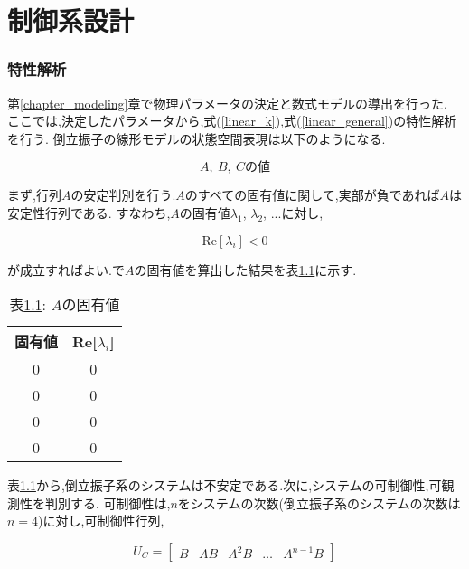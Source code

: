 \chapter{制御系設計}
\subsection{特性解析}
第\ref{chapter_modeling}章で物理パラメータの決定と数式モデルの導出を行った.
ここでは,決定したパラメータから,式(\ref{linear_k}),式(\ref{linear_general})の特性解析を行う.
倒立振子の線形モデルの状態空間表現は以下のようになる.

\begin{equation}
    A,\ B,\ Cの値
    \label{ABC}
\end{equation}

まず,行列$A$の安定判別を行う.$A$のすべての固有値に関して,実部が負であれば$A$は安定性行列である.
すなわち,$A$の固有値$\lambda_{1}$, $\lambda_{2}$, $...$に対し,

$$
    \mbox{Re}[\lambda_{i}] < 0
$$

が成立すればよい.\MaTX{}で$A$の固有値を算出した結果を表\ref{eigen_A}に示す.

\begin{table}[htbp]
    \begin{center}
        \caption{表\ref{eigen_A}: $A$の固有値}
        \begin{tabular}{|c|c|} \hline
            固有値 & Re[$\lambda_{i}$] \\ \hline \hline
            0 & 0 \\ \hline
            0 & 0 \\ \hline
            0 & 0 \\ \hline
            0 & 0 \\ \hline
        \end{tabular}
        \label{eigen_A}
    \end{center}
\end{table}

表\ref{eigen_A}から,倒立振子系のシステムは不安定である.次に,システムの可制御性,可観測性を判別する.
可制御性は,$n$をシステムの次数(倒立振子系のシステムの次数は$n = 4$)に対し,可制御性行列,

$$
    U_{C} =
    \left[
        \begin{array}{ccccc}
            B  &  AB  &  A^2B  &  \dots  &  A^{n-1}B
        \end{array}
    \right]
$$

